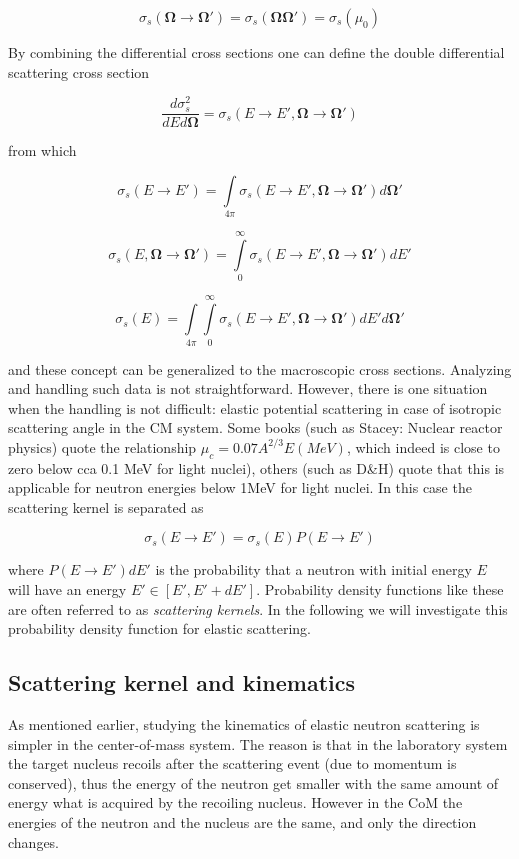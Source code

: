 $$\sigma_s(\mathbf{\Omega}\rightarrow \mathbf{\Omega}')=\sigma_s(\mathbf{\Omega}\mathbf{\Omega}')=\sigma_s(\mu_0)$$

By combining the differential cross sections one can define the double differential scattering cross section

$$\frac{d\sigma_s^2}{dEd\mathbf{\Omega}}=\sigma_s(E\rightarrow E',\mathbf{\Omega}\rightarrow \mathbf{\Omega}')$$

\noindent from which

$$\sigma_s(E\rightarrow E')=\int\limits_{4\pi}\sigma_s(E\rightarrow E',\mathbf{\Omega}\rightarrow \mathbf{\Omega}')d\mathbf{\Omega}'$$

$$\sigma_s(E,\mathbf{\Omega}\rightarrow \mathbf{\Omega}')=\int\limits_{0}^\infty\sigma_s(E\rightarrow E',\mathbf{\Omega}\rightarrow \mathbf{\Omega}')dE'$$

$$\sigma_s(E)=\int\limits_{4\pi}\int\limits_{0}^\infty\sigma_s(E\rightarrow E',\mathbf{\Omega}\rightarrow \mathbf{\Omega}')dE'd\mathbf{\Omega}'$$

\noindent and these concept can be generalized to the macroscopic cross sections. Analyzing and handling such data is not straightforward. However, there is one situation when the handling is not difficult: elastic potential scattering in case of isotropic scattering angle in the CM system. Some books (such as Stacey: Nuclear reactor physics) quote the relationship $\mu_c=0.07A^{2/3}E(MeV)$, which indeed is close to zero below cca 0.1 MeV for light nuclei), others (such as D\&H) quote that this is applicable for neutron energies below 1MeV for light nuclei. In this case the scattering kernel is separated as

$$\sigma_s(E\rightarrow E')=\sigma_s(E)P(E\rightarrow E')$$

\noindent where $P(E\rightarrow E')dE'$ is the probability that a neutron with initial energy $E$ will have an energy $E' \in [E',E'+dE']$. Probability density functions like these are often referred to as \textit{scattering kernels}. In the following we will investigate this probability density function for elastic scattering.

\subsection{Scattering kernel and kinematics}

As mentioned earlier, studying the kinematics of elastic neutron scattering is simpler in the center-of-mass system. The reason is that in the laboratory system the target nucleus recoils after the scattering event (due to momentum is conserved), thus the energy of the neutron get smaller with the same amount of energy what is acquired by the recoiling nucleus. However in the CoM the energies of the neutron and the nucleus are the same, and only the direction changes. 

